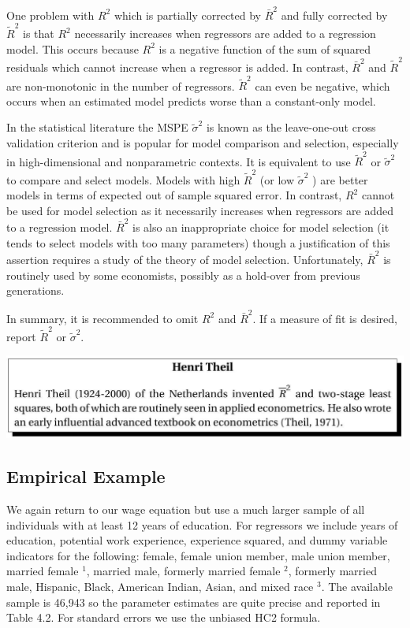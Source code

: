 \documentclass[10pt]{article}
\begin{document}
One problem with $R^{2}$ which is partially corrected by $\bar{R}^{2}$ and fully corrected by $\widetilde{R}^{2}$ is that $R^{2}$ necessarily increases when regressors are added to a regression model. This occurs because $R^{2}$ is a negative function of the sum of squared residuals which cannot increase when a regressor is added. In contrast, $\bar{R}^{2}$ and $\widetilde{R}^{2}$ are non-monotonic in the number of regressors. $\widetilde{R}^{2}$ can even be negative, which occurs when an estimated model predicts worse than a constant-only model.

In the statistical literature the MSPE $\widetilde{\sigma}^{2}$ is known as the leave-one-out cross validation criterion and is popular for model comparison and selection, especially in high-dimensional and nonparametric contexts. It is equivalent to use $\widetilde{R}^{2}$ or $\widetilde{\sigma}^{2}$ to compare and select models. Models with high $\widetilde{R}^{2}$ (or low $\widetilde{\sigma}^{2}$ ) are better models in terms of expected out of sample squared error. In contrast, $R^{2}$ cannot be used for model selection as it necessarily increases when regressors are added to a regression model. $\bar{R}^{2}$ is also an inappropriate choice for model selection (it tends to select models with too many parameters) though a justification of this assertion requires a study of the theory of model selection. Unfortunately, $\bar{R}^{2}$ is routinely used by some economists, possibly as a hold-over from previous generations.

In summary, it is recommended to omit $R^{2}$ and $\bar{R}^{2}$. If a measure of fit is desired, report $\widetilde{R}^{2}$ or $\widetilde{\sigma}^{2}$.

\includegraphics[max width=\textwidth]{2022_09_17_46fafb30295495354ae2g-24}

\subsection{Empirical Example}
We again return to our wage equation but use a much larger sample of all individuals with at least 12 years of education. For regressors we include years of education, potential work experience, experience squared, and dummy variable indicators for the following: female, female union member, male union member, married female ${ }^{1}$, married male, formerly married female ${ }^{2}$, formerly married male, Hispanic, Black, American Indian, Asian, and mixed race ${ }^{3}$. The available sample is 46,943 so the parameter estimates are quite precise and reported in Table 4.2. For standard errors we use the unbiased HC2 formula.
\end{document}
